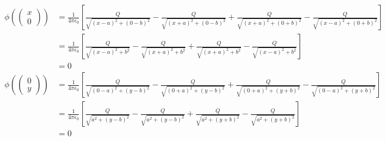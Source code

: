 \documentclass[11pt a4paper]{article}
\newcommand{\kco}{\frac{1}{4\pi\epsilon_0}}
\begin{document}
\begin{align*}
	\phi \left( \begin{pmatrix} x \\ 0 \end{pmatrix} \right) 
	&= \kco \left[
		\frac{Q}{\sqrt{(x-a)^2 + (0-b)^2}}
		- \frac{Q}{\sqrt{(x+a)^2 + (0-b)^2}}
		+ \frac{Q}{\sqrt{(x + a)^2 + (0+b)^2}}
		- \frac{Q}{\sqrt{(x-a)^2 + (0+b)^2}}
	\right] \\
	&= \kco \left[
		\frac{Q}{\sqrt{(x-a)^2 + b^2}}
		- \frac{Q}{\sqrt{(x+a)^2 + b^2}}
		+ \frac{Q}{\sqrt{(x + a)^2 + b^2}}
		- \frac{Q}{\sqrt{(x-a)^2 + b^2}}
	\right] \\
	&= 0 \\
	\phi \left( \begin{pmatrix} 0 \\ y \end{pmatrix} \right) 
	&= \kco \left[
		\frac{Q}{\sqrt{(0-a)^2 + (y-b)^2}}
		- \frac{Q}{\sqrt{(0+a)^2 + (y-b)^2}}
		+ \frac{Q}{\sqrt{(0 + a)^2 + (y+b)^2}}
		- \frac{Q}{\sqrt{(0-a)^2 + (y+b)^2}}
	\right] \\
	&= \kco \left[
		\frac{Q}{\sqrt{a^2 + (y-b)^2}}
		- \frac{Q}{\sqrt{a^2 + (y-b)^2}}
		+ \frac{Q}{\sqrt{a^2 + (y+b)^2}}
		- \frac{Q}{\sqrt{a^2 + (y+b)^2}}
	\right] \\
	&= 0
\end{align*}

\newpage
\end{document}
